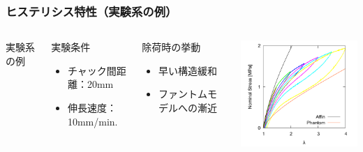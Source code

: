 \documentclass[11pt, dvipdfmx]{beamer}
\begin{document}
\begin{frame}
\frametitle{ヒステリシス特性（実験系の例）}

\begin{columns}[totalwidth=1\textwidth]

{\Large 実験系の例}

\small
\begin{block}{実験条件}
\begin{itemize}
\item
チャック間距離：20mm
\item
伸長速度：10mm/min.
\end{itemize}
\end{block}

\begin{alertblock}{除荷時の挙動}
\begin{itemize}
\item
早い構造緩和
\item
ファントムモデルへの漸近
\end{itemize}
\end{alertblock}
\centering
\includegraphics[width=70mm]{./fig/Hysteresis_10mm.pdf}

\end{columns}

\end{frame}
\end{document}
